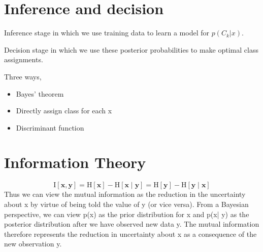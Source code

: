 \documentclass[11pt,en,cite=authoryear]{elegantpaper}
\begin{document}
\section{Inference and decision}
Inference stage in which we use training data to learn a model for $p(C_k| x)$. 

Decision stage in which we use these posterior probabilities to make optimal class assignments.

Three ways,
\begin{itemize}
    \item Bayes' theorem
    \item Directly assign class for each x
    \item Discriminant function
\end{itemize}

\section{Information Theory}
$$
\mathrm{I}[\mathbf{x}, \mathbf{y}]=\mathrm{H}[\mathbf{x}]-\mathrm{H}[\mathbf{x} \mid \mathbf{y}]=\mathrm{H}[\mathbf{y}]-\mathrm{H}[\mathbf{y} \mid \mathbf{x}]
$$
Thus we can view the mutual information as the reduction in the uncertainty about x by virtue of being told the value of y (or vice versa). From a Bayesian perspective, we can view p(x) as the prior distribution for x and p(x| y) as the posterior distribution after we have observed new data y. The mutual information therefore represents the reduction in uncertainty about x as a consequence of the new observation y.




\appendix
\addappheadtotoc
\end{document}
